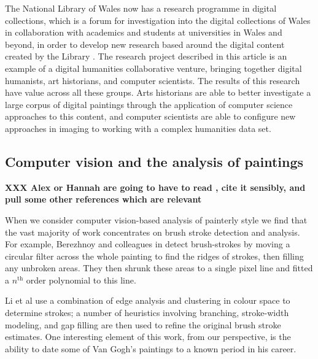 \documentclass[conference,a4paper]{IEEEtran}
\begin{document}
The National Library of Wales now has a research programme in digital
collections, which is a forum for investigation into the digital collections of
Wales in collaboration with academics and students at universities in Wales and
beyond, in order to develop new research based around the digital content
created by the Library \cite{llgc}. The research project described in this
article is an example of a digital humanities collaborative venture, bringing
together digital humanists, art historians, and computer scientists.  The
results of this research have value across all these groups. Arts historians
are able to better investigate a large corpus of digital paintings through the
application of computer science approaches to this content, and computer
scientists are able to configure new approaches in imaging to working with a
complex humanities data set. 

\subsection{Computer vision and the analysis of paintings}


\textbf{XXX Alex or Hannah are going to have to read \cite{Stork2009Computer}, cite it sensibly, and pull some other references which are relevant}

When we consider computer vision-based analysis of painterly style we find that
the vast majority of  work concentrates on brush stroke detection and analysis.
For example, Berezhnoy and colleagues in \cite{Berezhnoy2009Automatic} detect
brush-strokes by moving a circular filter across the whole painting to find the
ridges of strokes, then filling any unbroken areas. They then shrunk these
areas to a single pixel line and fitted a $n^{\text{th}}$ order polynomial to
this line.

Li et al \cite{Li2012Rhythmic} use a combination of edge analysis and
clustering in colour space to determine strokes; a number of heuristics
involving branching, stroke-width modeling, and gap filling are then used to
refine the original brush stroke estimates. One interesting element of this
work, from our perspective, is the ability to date some of Van Gogh's paintings
to a known period in his career.
\end{document}
